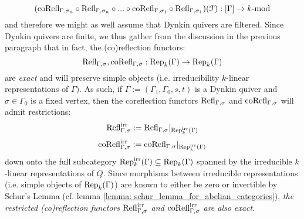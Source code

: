 \begin{remark}
\begin{enumerate}
                        $$(\mathrm{co}\mathrm{Refl}_{\Gamma, \sigma_n} \circ \mathrm{Refl}_{\Gamma, \sigma_n} \circ ... \circ \mathrm{co}\mathrm{Refl}_{\Gamma, \sigma_1} \circ \mathrm{Refl}_{\Gamma, \sigma_1})(\mathcal{F}): [\Gamma] \to k\text{-}\mathrm{mod}$$
                    and therefore we might as well assume that Dynkin quivers are filtered. Since Dynkin quivers are finite, we thus gather from the discussion in the previous paragraph that in fact, the (co)reflection functors:
                        $$\mathrm{Refl}_{\Gamma, \sigma}, \mathrm{co}\mathrm{Refl}_{\Gamma, \sigma}: \mathrm{Rep}_k(\Gamma) \to \mathrm{Rep}_k(\Gamma)$$
                    are \textit{exact} and will preserve simple objects (i.e. irreducibility $k$-linear representations of $\Gamma$). As such, if $\Gamma := (\Gamma_1, \Gamma_0, s, t)$ is a Dynkin quiver and $\sigma \in \Gamma_0$ is a fixed vertex, then the coreflection functors $\mathrm{Refl}_{\Gamma, \sigma}$ and $\mathrm{co}\mathrm{Refl}_{\Gamma, \sigma}$ will admit restrictions:
                        $$\mathrm{Refl}_{\Gamma, \sigma}^{\mathrm{irr}} := \mathrm{Refl}_{\Gamma, \sigma}|_{\mathrm{Rep}_k^{\mathrm{irr}}(\Gamma)}$$
                        $$\mathrm{co}\mathrm{Refl}_{\Gamma, \sigma}^{\mathrm{irr}} := \mathrm{co}\mathrm{Refl}_{\Gamma, \sigma}|_{\mathrm{Rep}_k^{\mathrm{irr}}(\Gamma)}$$
                    down onto the full subcategory $\mathrm{Rep}_k^{\mathrm{irr}}(\Gamma) \subseteq \mathrm{Rep}_k(\Gamma)$ spanned by the irreducible $k$-linear representations of $Q$. Since morphisms between irreducible representations (i.e. simple objects of $\mathrm{Rep}_k(\Gamma)$) are known to either be zero or invertible by Schur's Lemma (cf. lemma \ref{lemma: schur_lemma_for_abelian_categories}), \textit{the restricted (co)reflection functors $\mathrm{Refl}_{\Gamma, \sigma}^{\mathrm{irr}}$ and $\mathrm{co}\mathrm{Refl}_{\Gamma, \sigma}^{\mathrm{irr}}$ are also exact.}
                \end{enumerate}
            \end{remark}
            
